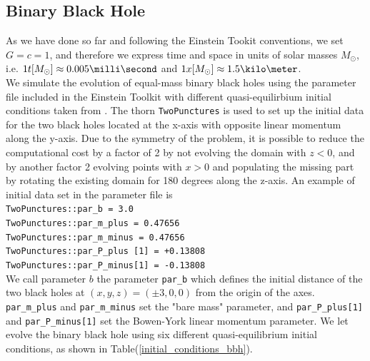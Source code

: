 \subsection{Binary Black Hole}
As we have done so far and following the Einstein Tookit conventions, we set $G=c=1$, and therefore we express time and space in units of solar masses $M_{\odot}$, i.e. $1 t [M_{\odot}] \approx 0.005 \milli \second$ and $1 x [M_{\odot}] \approx 1.5 \kilo \meter$.\\
We simulate the evolution of equal-mass binary black holes using the parameter file included in the Einstein Toolkit \cite{loffler_einstein_2012} with different quasi-equilirbium initial conditions taken from \cite{tichy_quasi-equilibrium_2004}.
The thorn \texttt{TwoPunctures} \cite{Ansorg:2004ds} is used to set up the initial data for the two black holes located at the x-axis with opposite linear momentum along the y-axis.
Due to the symmetry of the problem, it is possible to reduce the computational cost by a factor of 2 by not evolving the domain with $z < 0$, and by another factor 2 evolving points with $x > 0$ and populating the missing part by rotating the existing domain for 180 degrees along the z-axis.
An example of initial data set in the parameter file is
\linebreak
\texttt{\\
TwoPunctures::par\_b             =  3.0 \\
TwoPunctures::par\_m\_plus        =  0.47656 \\
TwoPunctures::par\_m\_minus       =  0.47656 \\
TwoPunctures::par\_P\_plus [1]    = +0.13808 \\
TwoPunctures::par\_P\_minus[1]    = -0.13808
\\
}
\linebreak
We call parameter $b$ the parameter \texttt{par\_b} which defines the initial distance of the two black holes at $(x,y,z) = (\pm 3,0,0)$ from the origin of the axes. 
\texttt{par\_m\_plus} and \texttt{par\_m\_minus} set the "bare mass" parameter, and \texttt{par\_P\_plus[1]} and \texttt{par\_P\_minus[1]} set the Bowen-York linear momentum parameter.
We let evolve the binary black hole using six different quasi-equilibrium initial conditions, as shown in Table(\ref{initial_conditions_bbh}).
